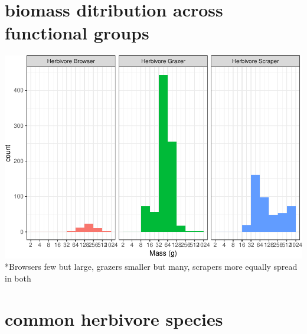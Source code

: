 \documentclass[]{article}
\begin{document}
\section{biomass ditribution across functional
groups}\label{biomass-ditribution-across-functional-groups}

\includegraphics{UVC-datasets-explore_files/figure-latex/unnamed-chunk-6-1.pdf}
*Browsers few but large, grazers smaller but many, scrapers more equally
spread in both

\section{common herbivore species}\label{common-herbivore-species}
\end{document}
